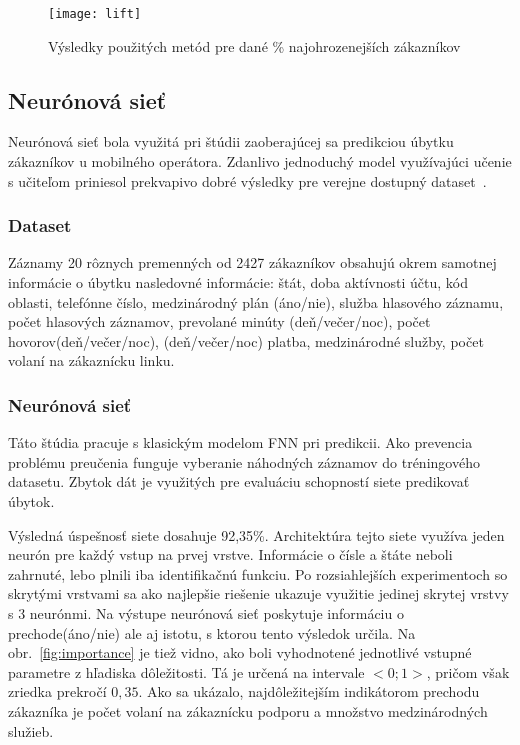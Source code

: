 \begin{figure}[H]
\begin{center}
\texttt{[image: lift]}\end{center}
\caption[lift]{Výsledky použitých metód pre dané \% najohrozenejších zákazníkov~\cite{burez2007crm}}
\label{fig:lift}
\end{figure}

\subsection{Neurónová sieť}
\label{metoda_neuronova_siet}

Neurónová sieť bola využitá pri štúdii zaoberajúcej sa predikciou úbytku zákazníkov u mobilného operátora. Zdanlivo jednoduchý model využívajúci učenie s učiteľom priniesol prekvapivo dobré výsledky pre verejne dostupný dataset~\cite{sharma2013neural}.

\subsubsection{Dataset}
\label{nn_dataset}

Záznamy 20 rôznych premenných od 2427 zákazníkov obsahujú okrem samotnej informácie o úbytku nasledovné informácie:
\newline
štát, doba aktívnosti účtu, kód oblasti, telefónne číslo, medzinárodný plán (áno/nie), služba hlasového záznamu, počet hlasových záznamov, prevolané minúty (deň/večer/noc), počet hovorov(deň/večer/noc), (deň/večer/noc) platba, medzinárodné služby, počet volaní na zákaznícku linku.

\subsubsection{Neurónová sieť}
\label{metoda_nn}

Táto štúdia pracuje s klasickým modelom FNN pri predikcii. Ako prevencia problému preučenia funguje vyberanie náhodných záznamov do tréningového datasetu. Zbytok dát je využitých pre evaluáciu schopností siete predikovať úbytok.

Výsledná úspešnosť siete dosahuje 92,35\%. Architektúra tejto siete využíva jeden neurón pre každý vstup na prvej vrstve. Informácie o čísle a štáte neboli zahrnuté, lebo plnili iba identifikačnú funkciu. Po rozsiahlejších experimentoch so skrytými vrstvami sa ako najlepšie riešenie ukazuje využitie jedinej skrytej vrstvy s 3 neurónmi. Na výstupe neurónová sieť poskytuje informáciu o prechode(áno/nie) ale aj istotu, s ktorou tento výsledok určila. 
\newline
Na obr.~\ref{fig:importance} je tiež vidno, ako boli vyhodnotené jednotlivé vstupné parametre z hľadiska dôležitosti. Tá je určená na intervale $<0; 1>$, pričom však zriedka prekročí $0,35$. Ako sa ukázalo, najdôležitejším indikátorom prechodu zákazníka je počet volaní na zákaznícku podporu a množstvo medzinárodných služieb.

